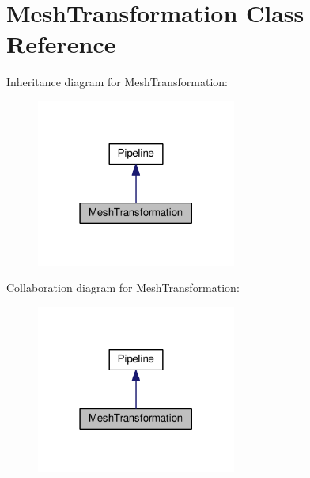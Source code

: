 \hypertarget{class_mesh_transformation}{}\section{Mesh\+Transformation Class Reference}
\label{class_mesh_transformation}


Inheritance diagram for Mesh\+Transformation\+:
\nopagebreak
\begin{figure}[H]
\begin{center}
\leavevmode
\includegraphics[width=186pt]{class_mesh_transformation__inherit__graph}
\end{center}
\end{figure}


Collaboration diagram for Mesh\+Transformation\+:
\nopagebreak
\begin{figure}[H]
\begin{center}
\leavevmode
\includegraphics[width=186pt]{class_mesh_transformation__coll__graph}
\end{center}
\end{figure}
